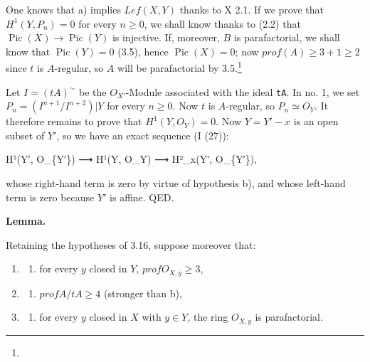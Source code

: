 \documentclass[
  11pt,
  a4paper,
]{book}
\newenvironment{Shaded}{}{}
\newcommand{\NormalTok}[1]{#1}
\providecommand{\tightlist}{%
  \setlength{\itemsep}{0pt}\setlength{\parskip}{0pt}}
\begin{document}
One knows that a) implies \(Lef(X, Y)\) thanks to X 2.1. If we prove
that \(H^{1}(Y, P_{n}) = 0\) for every \(n \geqslant 0\), we shall know
thanks to (2.2) that \(\operatorname{Pic}(X) \to \operatorname{Pic}(Y)\)
is injective. If, moreover, \(B\) is parafactorial, we shall know that
\(\operatorname{Pic}(Y) = 0\) (3.5), hence
\(\operatorname{Pic}(X) = 0\); now \(prof(A)
\geqslant 3 + 1 \geqslant 2\) since \(t\) is \(A\)-regular, so \(A\)
will be parafactorial by 3.5.\footnote{}

Let \(I = (tA)^{\sim}\) be the \(O_{X'}\)-Module associated with the
ideal \texttt{tA}. In no. 1, we set \(P_{n} =
(I^{n+1}/I^{n+2})|Y\) for every \(n \geqslant 0\). Now \(t\) is
\(A\)-regular, so \(P_{n} \simeq O_{Y}\). It therefore remains to prove
that \(H^{1}(Y, O_{Y}) = 0\). Now \(Y = Y' - {x}\) is an open subset of
\(Y'\), so we have an exact sequence (I (27)):

\begin{Shaded}
\begin{Highlighting}[]
\NormalTok{H¹(Y′, O\_\{Y′\}) ⟶ H¹(Y, O\_Y) ⟶ H²\_x(Y′, O\_\{Y′\}),}
\end{Highlighting}
\end{Shaded}

whose right-hand term is zero by virtue of hypothesis b), and whose
left-hand term is zero because \(Y'\) is affine. QED.

\textbf{Lemma.}

Retaining the hypotheses of 3.16, suppose moreover that:

\begin{enumerate}
\def\labelenumi{\arabic{enumi}.}
\tightlist
\item
  \begin{enumerate}
  \def\labelenumii{(\alph{enumii})}
  \setcounter{enumii}{2}
  \tightlist
  \item
    for every \(y\) closed in \(Y\), \(prof O_{X,y} \geqslant 3\),
  \end{enumerate}
\item
  \begin{enumerate}
  \def\labelenumii{(\alph{enumii})}
  \setcounter{enumii}{3}
  \tightlist
  \item
    \(prof A/tA \geqslant 4\) (stronger than b),
  \end{enumerate}
\item
  \begin{enumerate}
  \def\labelenumii{(\alph{enumii})}
  \setcounter{enumii}{4}
  \tightlist
  \item
    for every \(y\) closed in \(X\) with \(y \in Y\), the ring
    \(O_{X,y}\) is parafactorial.
  \end{enumerate}
\end{enumerate}
\end{document}
